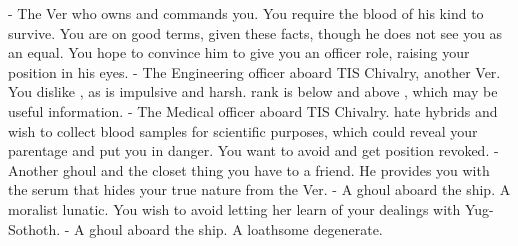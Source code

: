 \documentclass[char]{guildcamp4}
\begin{document}
\begin{itemz}[Notes]
	\item 
\end{itemz}

\begin{contacts}
	\contact{\cVone{}} - The Ver who owns and commands you. You require the blood of his kind to survive. You are on good terms, given these facts, though he does not see you as an equal. You hope to convince him to give you an officer role, raising your position in his eyes.
	\contact{\cVtwo{}} - The Engineering officer aboard TIS Chivalry, another Ver. You dislike \cVtwo{\them}, as \cVtwo{\they} is impulsive and harsh. \cVtwo{\their} rank is below \cVone{} and above \cVthree{}, which may be useful information.
	\contact{\cVthree{}} - The Medical officer aboard TIS Chivalry. \cVthree{\They} hate hybrids and wish to collect blood samples for scientific purposes, which could reveal your parentage and put you in danger. You want to avoid \cVthree{\them} and get \cVthree{\their} position revoked.
	\contact{\cJames{}} - Another ghoul and the closet thing you have to a friend. He provides you with the serum that hides your true nature from the Ver. 
	\contact{\cJoan{}} - A ghoul aboard the ship. A moralist lunatic. You wish to avoid letting her learn of your dealings with Yug-Sothoth.  
	\contact{\cJulie{}} - A ghoul aboard the ship. A loathsome degenerate. 
\end{contacts}

\end{document}
